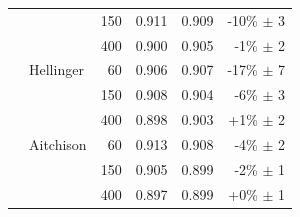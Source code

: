 \begin{tabular}{llrrrr}
 &  & 150 & 0.911 & 0.909 & -10\% $\pm$ 3 \\
 &  & 400 & 0.900 & 0.905 & -1\% $\pm$ 2 \\
 & Hellinger & 60 & 0.906 & 0.907 & -17\% $\pm$ 7 \\
 &  & 150 & 0.908 & 0.904 & -6\% $\pm$ 3 \\
 &  & 400 & 0.898 & 0.903 & +1\% $\pm$ 2 \\
 & Aitchison & 60 & 0.913 & 0.908 & -4\% $\pm$ 2 \\
 &  & 150 & 0.905 & 0.899 & -2\% $\pm$ 1 \\
 &  & 400 & 0.897 & 0.899 & +0\% $\pm$ 1 \\
\bottomrule
\end{tabular}